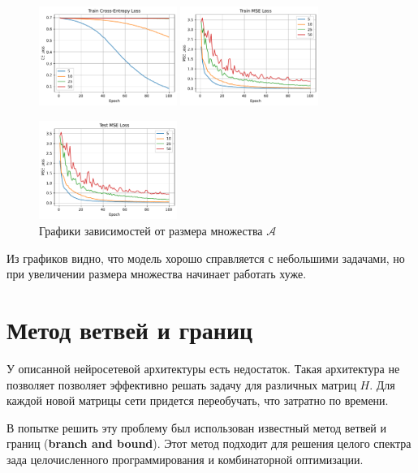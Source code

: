 \documentclass[12pt]{article}
\begin{document}
\begin{figure}
    \centering
    \includegraphics[width=0.4\textwidth]{adnn_M_epoch_train_loss.pdf}
    \quad
    \includegraphics[width=0.4\textwidth]{adnn_M_epoch_train_mse.pdf}
    
    \includegraphics[width=0.4\textwidth]{adnn_M_epoch_test_mse.pdf}
    \caption{Графики зависимостей от размера множества $\mathcal{A}$}
    \label{adnn_M}
\end{figure}

Из графиков видно, что модель хорошо справляется с небольшими задачами, но при увеличении размера множества начинает работать хуже.

\section{Метод ветвей и границ}
У описанной нейросетевой архитектуры есть недостаток. Такая архитектура не позволяет позволяет эффективно решать задачу для различных матриц $H$. Для каждой новой матрицы сети придется переобучать, что затратно по времени.

В попытке решить эту проблему был использован известный метод ветвей и границ (\textbf{branch and bound}). Этот метод подходит для решения целого спектра зада целочисленного программирования и комбинаторной оптимизации.
\end{document}
